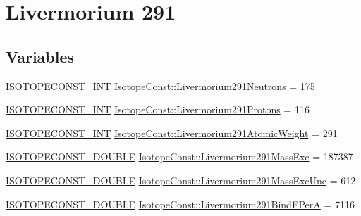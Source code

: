 \hypertarget{group___isotope_const-_livermorium-_lv291}{}\section{Livermorium 291}
\label{group___isotope_const-_livermorium-_lv291}
\subsection*{Variables}
\begin{DoxyCompactItemize}
\item 
\mbox{\hyperlink{group___isotope_const-_macros_ga5f18360b3e99483a35c32d789e62621c}{I\+S\+O\+T\+O\+P\+E\+C\+O\+N\+S\+T\+\_\+\+I\+NT}} \mbox{\hyperlink{group___isotope_const-_livermorium-_lv291_ga28ee9ef842fecf428784aff34ebfa2e9}{Isotope\+Const\+::\+Livermorium291\+Neutrons}} = 175
\item 
\mbox{\hyperlink{group___isotope_const-_macros_ga5f18360b3e99483a35c32d789e62621c}{I\+S\+O\+T\+O\+P\+E\+C\+O\+N\+S\+T\+\_\+\+I\+NT}} \mbox{\hyperlink{group___isotope_const-_livermorium-_lv291_ga4f959a704dcaf83ab8a25b9ec09a5373}{Isotope\+Const\+::\+Livermorium291\+Protons}} = 116
\item 
\mbox{\hyperlink{group___isotope_const-_macros_ga5f18360b3e99483a35c32d789e62621c}{I\+S\+O\+T\+O\+P\+E\+C\+O\+N\+S\+T\+\_\+\+I\+NT}} \mbox{\hyperlink{group___isotope_const-_livermorium-_lv291_ga5b7573df0e3f9b3e5298613d50cafa41}{Isotope\+Const\+::\+Livermorium291\+Atomic\+Weight}} = 291
\item 
\mbox{\hyperlink{group___isotope_const-_macros_ga8f45a7272ce02c0b4c65c44636ed719a}{I\+S\+O\+T\+O\+P\+E\+C\+O\+N\+S\+T\+\_\+\+D\+O\+U\+B\+LE}} \mbox{\hyperlink{group___isotope_const-_livermorium-_lv291_gac807ba1bb78e49f6939b8033a5cee41e}{Isotope\+Const\+::\+Livermorium291\+Mass\+Exc}} = 187387
\item 
\mbox{\hyperlink{group___isotope_const-_macros_ga8f45a7272ce02c0b4c65c44636ed719a}{I\+S\+O\+T\+O\+P\+E\+C\+O\+N\+S\+T\+\_\+\+D\+O\+U\+B\+LE}} \mbox{\hyperlink{group___isotope_const-_livermorium-_lv291_ga29c32d21f9d1a0647ad6a386fc24dbec}{Isotope\+Const\+::\+Livermorium291\+Mass\+Exc\+Unc}} = 612
\item 
\mbox{\hyperlink{group___isotope_const-_macros_ga8f45a7272ce02c0b4c65c44636ed719a}{I\+S\+O\+T\+O\+P\+E\+C\+O\+N\+S\+T\+\_\+\+D\+O\+U\+B\+LE}} \mbox{\hyperlink{group___isotope_const-_livermorium-_lv291_ga11086cadb6c8d0fbc7192febe0a54820}{Isotope\+Const\+::\+Livermorium291\+Bind\+E\+PerA}} = 7116

\end{DoxyCompactItemize}
